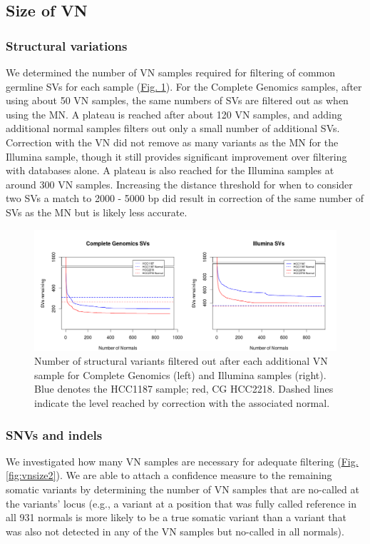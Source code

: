 \subsection*{Size of VN}

\subsubsection*{Structural variations}
We determined the number of VN samples required for filtering of common germline SVs for each sample (\hyperref[fig:vnsize]{Fig. \ref{fig:vnsize}}). For the Complete Genomics samples, after using about 50 VN samples, the same numbers of SVs are filtered out as when using the MN. A plateau is reached after about 120 VN samples, and adding additional normal samples filters out only a small number of additional SVs. Correction with the VN did not remove as many variants as the MN for the Illumina sample, though it still provides significant improvement over filtering with databases alone. A plateau is also reached for the Illumina samples at around 300 VN samples. Increasing the distance threshold for when to consider two SVs a match to 2000 - 5000 bp did result in correction of the same number of SVs as the MN but is likely less accurate.

\begin{figure}[t!]
\centering
\includegraphics[width=\textwidth]{chapters/images/virtualnormal/Hiltemann_Figure3.png}
\caption{Number of structural variants filtered out after each additional VN sample for Complete Genomics (left) and Illumina samples (right). Blue denotes the HCC1187 sample; red, CG HCC2218. Dashed lines indicate the level reached by correction with the associated normal. }
\label{fig:vnsize}
\end{figure}

\subsubsection*{SNVs and indels}
We investigated how many VN samples are necessary for adequate filtering (\hyperref[fig:vnsize2]{Fig. \ref{fig:vnsize2}}). We are able to attach a confidence measure to the remaining somatic variants by determining the number of VN samples that are no-called at the variants’ locus (e.g., a variant at a position that was fully called reference in all 931 normals is more likely to be a true somatic variant than a variant that was also not detected in any of the VN samples but no-called in all normals).


